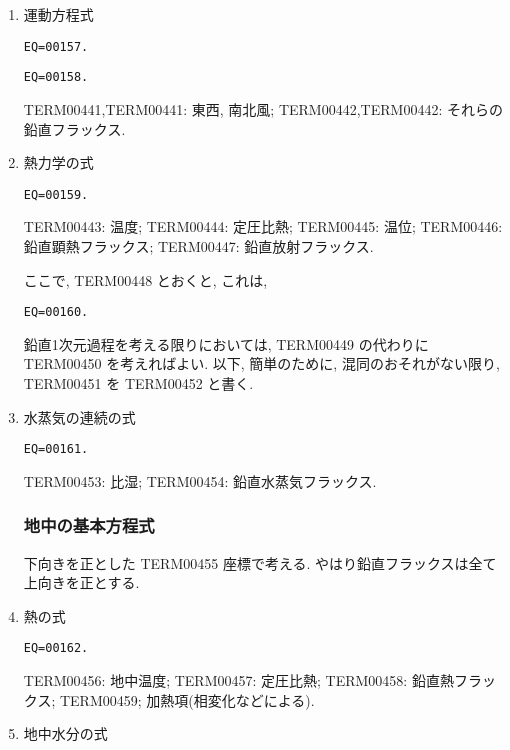 \begin{enumerate}
\item 運動方程式

\begin{verbatim}
EQ=00157.
\end{verbatim}
\begin{verbatim}
EQ=00158.
\end{verbatim}

TERM00441,TERM00441: 東西, 南北風; 
TERM00442,TERM00442: それらの鉛直フラックス.

\item 熱力学の式

\begin{verbatim}
EQ=00159.
\end{verbatim}

TERM00443: 温度; 
TERM00444: 定圧比熱; 
TERM00445: 温位;
TERM00446: 鉛直顕熱フラックス;
TERM00447: 鉛直放射フラックス.

ここで, TERM00448 とおくと, これは,
\begin{verbatim}
EQ=00160.
\end{verbatim}

鉛直1次元過程を考える限りにおいては,
TERM00449 の代わりに TERM00450 を考えればよい.
以下, 簡単のために, 混同のおそれがない限り,
TERM00451 を TERM00452 と書く.

\item 水蒸気の連続の式

\begin{verbatim}
EQ=00161.
\end{verbatim}

TERM00453: 比湿; 
TERM00454: 鉛直水蒸気フラックス.

\subsubsection{地中の基本方程式}

下向きを正とした TERM00455 座標で考える. 
やはり鉛直フラックスは全て上向きを正とする.

\item 熱の式

\begin{verbatim}
EQ=00162.
\end{verbatim}

TERM00456: 地中温度; TERM00457: 定圧比熱; 
TERM00458: 鉛直熱フラックス;
TERM00459; 加熱項(相変化などによる).

\item 地中水分の式


\end{enumerate}
